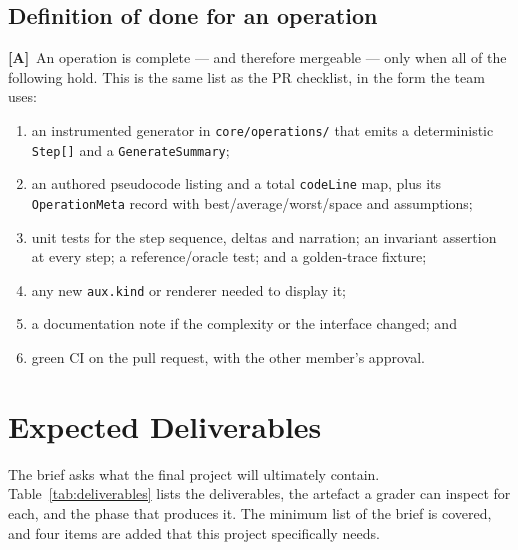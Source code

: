 \documentclass[11pt,a4paper]{article}
\newcommand{\A}{\textcolor{asmc}{\textbf{[A]}}}     %
\newcommand{\ct}[1]{\texttt{#1}}
\begin{document}
\subsection{Definition of done for an operation}

\A\ An operation is complete --- and therefore mergeable --- only when all of the following
hold. This is the same list as the PR checklist, in the form the team uses:

\begin{enumerate}[leftmargin=1.6em,topsep=2pt,itemsep=1pt]
  \item an instrumented generator in \ct{core/operations/} that emits a deterministic
        \ct{Step[]} and a \ct{GenerateSummary};
  \item an authored pseudocode listing and a total \ct{codeLine} map, plus its
        \ct{OperationMeta} record with best/average/worst/space and assumptions;
  \item unit tests for the step sequence, deltas and narration; an invariant assertion at
        every step; a reference/oracle test; and a golden-trace fixture;
  \item any new \ct{aux.kind} or renderer needed to display it;
  \item a documentation note if the complexity or the interface changed; and
  \item green CI on the pull request, with the other member's approval.
\end{enumerate}

\section{Expected Deliverables}

The brief asks what the final project will ultimately contain. Table~\ref{tab:deliverables}
lists the deliverables, the artefact a grader can inspect for each, and the phase that
produces it. The minimum list of the brief is covered, and four items are added that this
project specifically needs.
\end{document}

